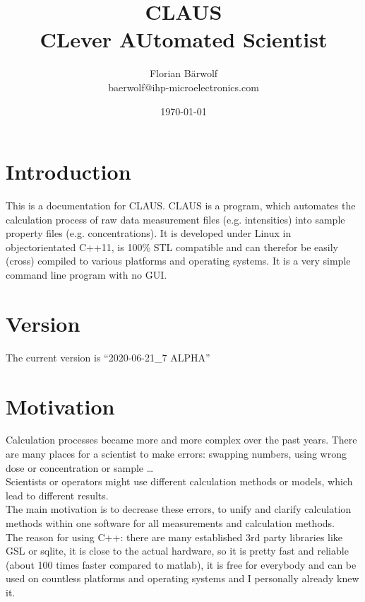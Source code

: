 \documentclass[a4paper,10pt]{article}
\title{CLAUS \\ CLever AUtomated Scientist}
\author{Florian Bärwolf  \\
	baerwolf@ihp-microelectronics.com \\
	}
\date{\today}
\begin{document}
\maketitle

\tableofcontents
\newpage


\section{Introduction}
This is a documentation for CLAUS. CLAUS is a program, which automates the calculation process of raw data measurement files (e.g. intensities) into sample property files (e.g. concentrations). It is developed under Linux in objectorientated C++11, is 100\% STL compatible and can therefor be easily (cross) compiled to various platforms and operating systems. It is a very simple command line program with no GUI.

\section{Version}
The current version is ``2020-06-21\_7 ALPHA''

\section{Motivation}
Calculation processes became more and more complex over the past years. There are many places for a scientist to make errors: swapping numbers, using wrong dose or concentration or sample \ldots \\
Scientists or operators might use different calculation methods or models, which lead to different results. \\
The main motivation is to decrease these errors, to unify and clarify calculation methods within one software for all measurements and calculation methods. \\
The reason for using C++: there are many established 3rd party libraries like GSL or sqlite, it is close to the actual hardware, so it is pretty fast and reliable (about 100 times faster compared to matlab), it is free for everybody and can be used on countless platforms and operating systems and I personally already knew it.
\end{document}
